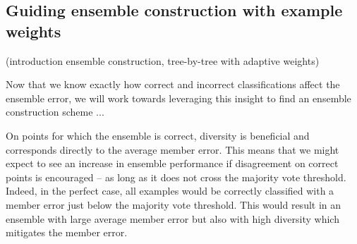 \documentclass[../main.tex]{subfiles}
\begin{document}






\subsection{Guiding ensemble construction with example weights}
\label{sec:guiding-ensemble-construction-with-example-weights}

(introduction ensemble construction, tree-by-tree with adaptive weights)

Now that we know exactly how correct and incorrect classifications affect the ensemble error, we will work towards leveraging this insight to find an ensemble construction scheme ...


On points for which the ensemble is correct, diversity is beneficial and corresponds directly to the average member error. This means that we might expect to see an increase in ensemble performance if disagreement on correct points is encouraged -- as long as it does not cross the majority vote threshold. Indeed, in the perfect case, all examples would be correctly classified with a member error just below the majority vote threshold. This would result in an ensemble with large average member error but also with high diversity which mitigates the member error.

\end{document}
